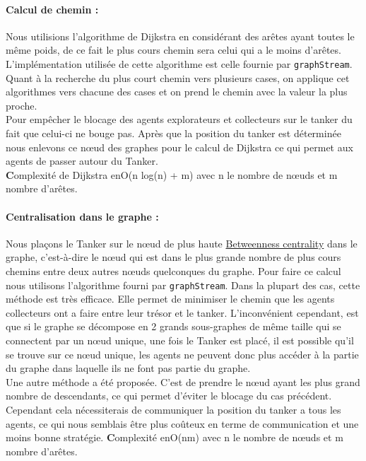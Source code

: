 \documentclass[10pt]{article}
\newcommand\tab[1][0.65cm]{\hspace*{#1}}
\begin{document}
\paragraph{Calcul de chemin :} Nous utilisions l'algorithme de Dijkstra en considérant des arêtes ayant toutes le même poids, de ce fait le plus cours chemin sera celui qui a le moins d'arêtes. L'implémentation utilisée de cette algorithme est celle fournie par \texttt{graphStream}. Quant à la recherche du plus court chemin vers plusieurs cases, on applique cet algorithmes vers chacune des cases et on prend le chemin avec la valeur la plus proche.\\
\tab Pour empêcher le blocage des agents explorateurs et collecteurs sur le tanker du fait que celui-ci ne bouge pas. Après que la position du tanker est déterminée nous enlevons ce n\oe{}ud des graphes pour le calcul de Dijkstra ce qui permet aux agents de passer autour du Tanker.\\
\tab \textbf Complexité de Dijkstra en{O(n log(n) + m)} avec n le nombre de n\oe{}uds et m nombre d'arêtes.

\paragraph{Centralisation dans le graphe :} Nous plaçons le Tanker sur le n\oe{}ud de plus haute \href{https://en.wikipedia.org/wiki/Betweenness_centrality}{Betweenness centrality} dans le graphe, c'est-à-dire le n\oe{}ud  qui est dans le plus grande nombre de plus cours chemins entre deux autres n\oe{}uds quelconques du graphe. Pour faire ce calcul nous utilisons l'algorithme fourni par \texttt{graphStream}. Dans la plupart des cas, cette méthode est très efficace. Elle permet de minimiser le chemin que les agents collecteurs ont a faire entre leur trésor et le tanker. L'inconvénient cependant, est que si le graphe se décompose en 2 grands sous-graphes de même taille qui se connectent par un n\oe{}ud unique, une fois le Tanker est placé, il est possible qu'il se trouve sur ce n\oe{}ud unique, les agents ne peuvent donc plus accéder à la partie du graphe dans laquelle ils ne font pas partie du graphe.\\
\tab Une autre méthode a été proposée. C'est de prendre le n\oe{}ud ayant les plus grand nombre de descendants, ce qui permet d'éviter le blocage du cas précédent. Cependant cela nécessiterais de communiquer la position du tanker a tous les agents, ce qui nous semblais être plus coûteux en terme de communication et une moins bonne stratégie.
\tab \textbf Complexité en{O(nm)} avec n le nombre de n\oe{}uds et m nombre d'arêtes.
\end{document}
